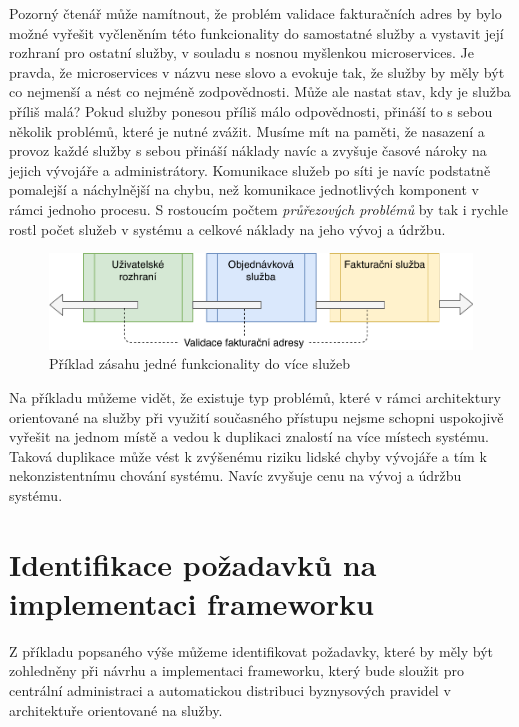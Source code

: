 Pozorný čtenář může namítnout, že problém validace fakturačních adres by
bylo možné vyřešit vyčleněním této funkcionality
do samostatné služby a vystavit její rozhraní pro ostatní služby,
v souladu s nosnou myšlenkou microservices. Je pravda, že microservices
v názvu nese slovo  a evokuje tak, že služby by měly být co nejmenší
a nést co nejméně zodpovědnosti. Může ale nastat stav, kdy je služba příliš malá?
Pokud služby ponesou příliš málo odpovědnosti,
přináší to s sebou několik problémů, které je nutné zvážit. Musíme mít na paměti, že
nasazení a provoz každé služby s sebou přináší náklady navíc
a zvyšuje časové nároky na jejich vývojáře a administrátory.
Komunikace služeb po síti je navíc podstatně pomalejší a náchylnější na
chybu, než komunikace jednotlivých komponent v rámci jednoho procesu.
S rostoucím počtem \textit{průřezových problémů} by tak i rychle rostl
počet služeb v systému a celkové náklady na jeho vývoj a údržbu.

\begin{figure}
    \centering
    \includegraphics[keepaspectratio=true, width=0.8\linewidth]{figures/service-cutting.pdf}
    \caption{Příklad zásahu jedné funkcionality do více služeb}
    \label{fig:service-cutting}
\end{figure}

Na příkladu můžeme vidět, že existuje typ problémů, které v rámci architektury
orientované na služby při využití současného přístupu nejsme schopni uspokojivě
vyřešit na jednom místě a vedou k duplikaci znalostí na více místech systému.
Taková duplikace může vést k zvýšenému riziku lidské chyby vývojáře a tím k
nekonzistentnímu chování systému. Navíc zvyšuje cenu na vývoj a údržbu systému.

\section{Identifikace požadavků na implementaci frameworku}\label{sec:implementation-requirements}

Z příkladu popsaného výše můžeme identifikovat požadavky, které by měly
být zohledněny při návrhu a implementaci frameworku, který bude sloužit
pro centrální administraci a automatickou distribuci byznysových pravidel
v architektuře orientované na služby.

